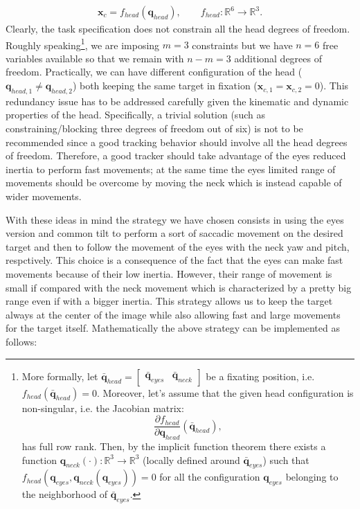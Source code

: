 \begin{eqnarray*}
\mathbf x_c = f_{head} (\mathbf q_{head}), \qquad f_{head} : \mathbb R^6 \longrightarrow \mathbb R^3.
\end{eqnarray*}
Clearly, the task specification does not constrain all the head degrees of freedom. Roughly speaking\footnote{More formally, let $\bar {\mathbf q}_{head} = \begin{bmatrix} \bar {\mathbf q}_{eyes} & \bar {\mathbf q}_{neck} \end{bmatrix}$ be a fixating position, i.e. $f_{head}(\bar {\mathbf q}_{head}) = 0$. Moreover, let's assume that the given head configuration is non-singular, i.e. the Jacobian matrix: $$\frac{\partial f_{head}}{\partial \mathbf q_{head}}(\bar {\mathbf q}_{head}),$$ has full row rank. Then, by the implicit function theorem there exists a function $\mathbf q_{neck}(\cdot): \mathbb R^3 \longrightarrow \mathbb R^3$ (locally defined around $\bar {\mathbf q}_{eyes}$) such that $f_{head}({\mathbf q}_{eyes}, {\mathbf q}_{neck} ({\mathbf q}_{eyes}) ) = 0$ for all the configuration ${\mathbf q}_{eyes}$ belonging to the neighborhood of $\bar {\mathbf q}_{eyes}$.}, we are imposing $m=3$ constraints but we have $n=6$ free variables available so that we remain with $n-m=3$ additional degrees of freedom. Practically, we can have different configuration of the head ($\mathbf q_{head,1} \neq \mathbf q_{head,2}$) both keeping the same target in fixation (${\mathbf x}_{c,1} = {\mathbf x}_{c,2} = 0$). This redundancy issue has to be addressed carefully given the kinematic and dynamic properties of the head. Specifically, a trivial solution (such as constraining/blocking three degrees of freedom out of six) is not to be recommended since a good tracking behavior should involve all the  head degrees of freedom. Therefore, a good tracker should take advantage of the eyes reduced inertia to perform fast movements; at the same time the eyes limited range of movements should be overcome by moving the neck which is instead capable of wider movements.

With these ideas in mind the strategy we have chosen consists in using the eyes version and common tilt to perform a sort of saccadic movement on the desired target and then to follow the movement of the eyes with the neck yaw and pitch, respctively. This choice is a consequence of the fact that the eyes can make fast movements because of their low inertia. However, their range of movement is small if compared with the neck movement which is characterized by a pretty big range even if with a bigger inertia. This strategy allows us to keep the target always at the center of the image while also allowing fast and large movements for the target itself. Mathematically the above strategy can be implemented as follows:

